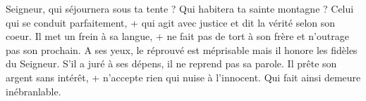 Seigneur, qui séjournera sous ta tente ?
Qui habitera ta sainte montagne ?
\versseparator
Celui qui se conduit parfaitement, +
qui agit avec justice
et dit la vérité selon son coeur.
\versseparator
Il met un frein à sa langue, +
ne fait pas de tort à son frère
et n'outrage pas son prochain.
\versseparator
A ses yeux, le réprouvé est méprisable
mais il honore les fidèles du Seigneur.
\versseparator
S'il a juré à ses dépens,
il ne reprend pas sa parole.
\versseparator
Il prête son argent sans intérêt, +
n'accepte rien qui nuise à l'innocent.
\versseparator
Qui fait ainsi demeure inébranlable.

